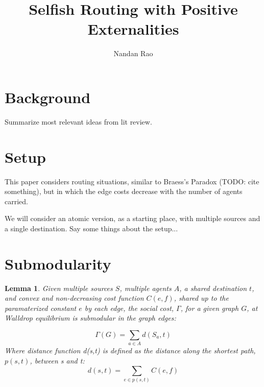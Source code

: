 \documentclass[a4paper,12pt]{article}
\newtheorem{lemma}[theorem]{Lemma}
\begin{document}
\title{Selfish Routing with Positive Externalities}

\author{Nandan Rao}

\maketitle

\section{Background}
Summarize most relevant ideas from lit review.

\section{Setup}
This paper considers routing situations, similar to Braess's Paradox (TODO: cite something), but in which the edge costs decrease with the number of agents carried.

We will consider an atomic version, as a starting place, with multiple sources and a single destination. Say some things about the setup...


\section{Submodularity}

\begin{lemma}
Given multiple sources $S$, multiple agents $A$, a shared destination $t$, and convex and non-decreasing cost function $C(e, f)$, shared up to the paramaterized constant $e$ by each edge, the social cost, $\Gamma$, for a given graph $G$, at Walldrop equilibrium is submodular in the graph edges:

$$
\Gamma(G) = \sum_{a \in A} d(S_a, t)
$$
%
Where distance function d(s,t) is defined as the distance along the shortest path, $p(s,t)$, between s and t:
%
$$
d(s,t) = \sum_{e \in p(s,t)} C(e,f)
$$
\end{lemma}
\end{document}
